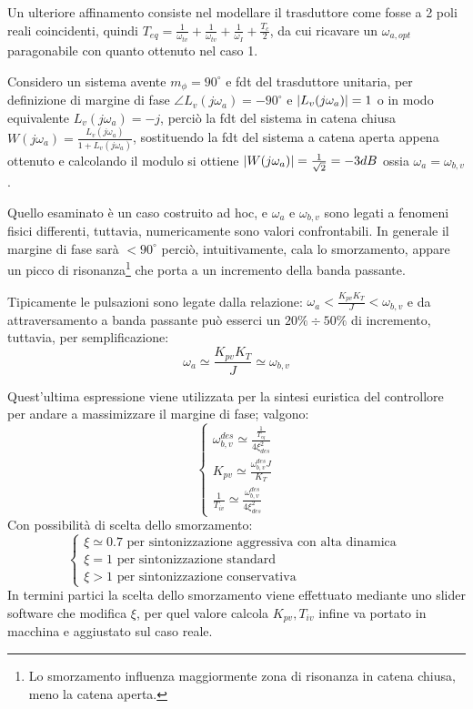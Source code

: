 Un ulteriore affinamento consiste nel modellare il trasduttore come fosse a 2 poli reali coincidenti, quindi \(T_{eq}=\frac{1}{\omega_{tv}}+\frac{1}{\omega_{tv}}+\frac{1}{\omega_I}+\frac{T_c}{2}\), da cui ricavare un \(\omega_{a,opt}\) paragonabile con quanto ottenuto nel caso 1.

Considero un sistema avente \(m_\phi=90^\circ\) e fdt del trasduttore unitaria, per definizione di margine di fase \(\angle{L_v(j\omega_a)} = -90^\circ\) e \(\left|L_v(j\omega_a)\right|=1\) o in modo equivalente \(L_v(j\omega_a)=-j\), perciò la fdt del sistema in catena chiusa \(W(j\omega_a)=\frac{L_v(j\omega_a)}{1+L_v(j\omega_a)}\), sostituendo la fdt del sistema a catena aperta appena ottenuto e calcolando il modulo si ottiene \(\left|W(j\omega_a)\right|=\frac{1}{\sqrt{2}}=-3dB\) ossia \(\omega_a=\omega_{b,v}\).

Quello esaminato è un caso costruito ad hoc, e \(\omega_a\) e \(\omega_{b,v}\) sono legati a fenomeni fisici differenti, tuttavia, numericamente sono valori confrontabili.
In generale il margine di fase sarà \(<90^\circ\) perciò, intuitivamente, cala lo smorzamento, appare un picco di risonanza\footnote{Lo smorzamento influenza maggiormente zona di risonanza in catena chiusa, meno la catena aperta.} che porta a un incremento della banda passante.

Tipicamente le pulsazioni sono legate dalla relazione: \(\omega_a < \frac{K_{pv}K_T}{J} < \omega_{b,v}\) e da attraversamento a banda passante può esserci un \(20\% \div 50\%\) di incremento, tuttavia, per semplificazione:
\[\omega_a \simeq \frac{K_{pv}K_T}{J} \simeq \omega_{b,v}\]

Quest'ultima espressione viene utilizzata per la sintesi euristica del controllore per andare a massimizzare il margine di fase; valgono:
\[
\begin{cases}
    \omega_{b,v}^{des} \simeq \frac{\frac{1}{T_{eq}}}{4\xi^2_{des}} \\
    K_{pv} \simeq \frac{\omega_{b,v}^{des}J}{K_T} \\
    \frac{1}{T_{iv}} \simeq \frac{\omega_{b,v}^{des}}{4\xi^2_{des}}
\end{cases}
\]
Con possibilità di scelta dello smorzamento:
\[
\begin{cases}
    \xi \simeq 0.7 \text{ \ per sintonizzazione aggressiva con alta dinamica } \\
    \xi = 1 \text{ \ per sintonizzazione standard} \\
    \xi > 1 \text{ \ per sintonizzazione conservativa}
\end{cases}
\]
In termini partici la scelta dello smorzamento viene effettuato mediante uno slider software che modifica \(\xi\), per quel valore calcola \(K_{pv}, T_{iv}\) infine va portato in macchina e aggiustato sul caso reale.


